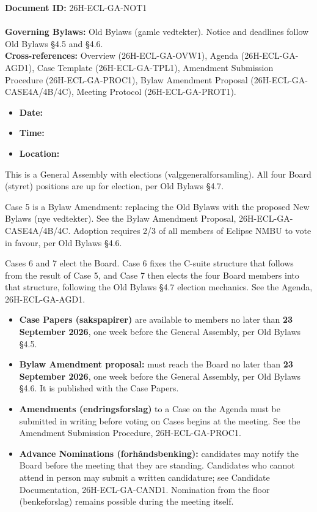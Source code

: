 \documentclass{../../../Common/Latex/Templates/rapport}
\date{\meetingdate, \meetingtime}
\begin{document}
\makecoverpage
\tableofcontents
\reportmainmatter

\noindent\textbf{Document ID:} 26H-ECL-GA-NOT1\\
\meetingline\\
\textbf{Governing Bylaws:} Old Bylaws (gamle vedtekter). Notice and deadlines follow Old Bylaws \S4.5 and \S4.6.\\
\textbf{Cross-references:} Overview (26H-ECL-GA-OVW1), Agenda (26H-ECL-GA-AGD1), Case Template (26H-ECL-GA-TPL1), Amendment Submission Procedure (26H-ECL-GA-PROC1), Bylaw Amendment Proposal (26H-ECL-GA-CASE4A/4B/4C), Meeting Protocol (26H-ECL-GA-PROT1).

\begin{itemize}
  \item \textbf{Date:} \meetingdate
  \item \textbf{Time:} \meetingtime
  \item \textbf{Location:} \meetinglocation
\end{itemize}

This is a General Assembly with elections (valggeneralforsamling). All four Board (styret) positions are up for election, per Old Bylaws \S4.7.

Case 5 is a Bylaw Amendment: replacing the Old Bylaws with the proposed New Bylaws (nye vedtekter). See the Bylaw Amendment Proposal, 26H-ECL-GA-CASE4A/4B/4C. Adoption requires 2/3 of all members of Eclipse NMBU to vote in favour, per Old Bylaws \S4.6.

Cases 6 and 7 elect the Board. Case 6 fixes the C-suite structure that follows from the result of Case 5, and Case 7 then elects the four Board members into that structure, following the Old Bylaws \S4.7 election mechanics. See the Agenda, 26H-ECL-GA-AGD1.


\begin{itemize}
  \item \textbf{Case Papers (sakspapirer)} are available to members no later than \textbf{23 September 2026}, one week before the General Assembly, per Old Bylaws \S4.5.
  \item \textbf{Bylaw Amendment proposal:} must reach the Board no later than \textbf{23 September 2026}, one week before the General Assembly, per Old Bylaws \S4.6. It is published with the Case Papers.
  \item \textbf{Amendments (endringsforslag)} to a Case on the Agenda must be submitted in writing before voting on Cases begins at the meeting. See the Amendment Submission Procedure, 26H-ECL-GA-PROC1.
  \item \textbf{Advance Nominations (forhåndsbenking):} candidates may notify the Board before the meeting that they are standing. Candidates who cannot attend in person may submit a written candidature; see Candidate Documentation, 26H-ECL-GA-CAND1. Nomination from the floor (benkeforslag) remains possible during the meeting itself.
\end{itemize}
\end{document}
